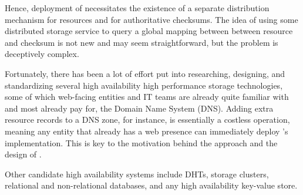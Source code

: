 Hence, deployment of \SYSTEM{} necessitates the existence of a separate
distribution mechanism for resources and for authoritative checksums. The idea
of using some distributed storage service to query a global mapping between
between resource and checksum is not new and may seem straightforward, but the
problem is deceptively complex.

Fortunately, there has been a lot of effort put into researching, designing, and
standardizing several high availability high performance storage technologies,
some of which web-facing entities and IT teams are already quite familiar with
and most already pay for, \eg the Domain Name System (DNS). Adding extra
resource records to a DNS zone, for instance, is essentially a costless
operation, meaning any entity that already has a web presence can immediately
deploy \SYSTEM{}'s \DNSSYS{} implementation. This is key to the motivation
behind the \SYSTEM{} approach and the design of \DNSSYS{}.

Other candidate high availability systems include DHTs, storage clusters,
relational and non-relational databases, and any high availability key-value
store.

